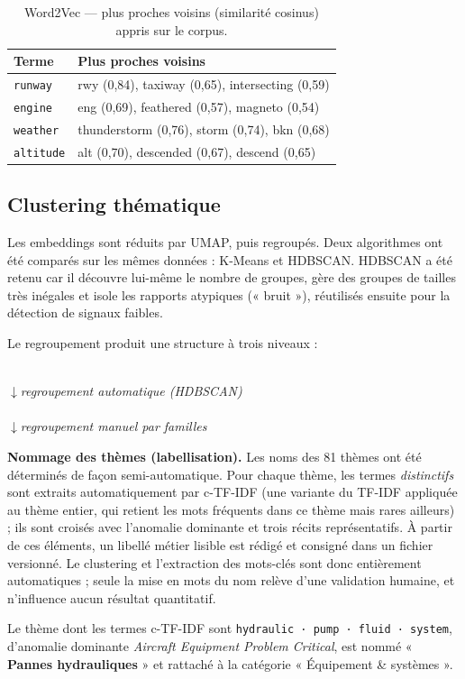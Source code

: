 \documentclass[11pt,a4paper]{article}
\newcommand{\exemple}[1]{\par\noindent #1}
\begin{document}
\begin{table}[h]\centering\small
\caption{Word2Vec — plus proches voisins (similarité cosinus) appris sur le corpus.}\label{tab:w2v}
\begin{tabular}{ll}
\toprule
\textbf{Terme} & \textbf{Plus proches voisins} \\
\midrule
\texttt{runway}   & rwy (0,84), taxiway (0,65), intersecting (0,59) \\
\texttt{engine}   & eng (0,69), feathered (0,57), magneto (0,54) \\
\texttt{weather}  & thunderstorm (0,76), storm (0,74), bkn (0,68) \\
\texttt{altitude} & alt (0,70), descended (0,67), descend (0,65) \\
\bottomrule
\end{tabular}
\end{table}

\subsection{Clustering thématique}
Les embeddings sont réduits par UMAP, puis regroupés. Deux algorithmes ont été comparés sur
les mêmes données : K-Means et HDBSCAN. HDBSCAN a été retenu car il découvre lui-même le
nombre de groupes, gère des groupes de tailles très inégales et isole les rapports atypiques
(« bruit »), réutilisés ensuite pour la détection de signaux faibles.

Le regroupement produit une structure à trois niveaux :
\begin{center}\small
{}\\[3pt]
$\downarrow$\;\textit{regroupement automatique (HDBSCAN)}\\[3pt]
\\[3pt]
$\downarrow$\;\textit{regroupement manuel par familles}\\[3pt]
\end{center}

\textbf{Nommage des thèmes (labellisation).} Les noms des 81 thèmes ont été déterminés de
façon semi-automatique. Pour chaque thème, les termes \emph{distinctifs} sont extraits
automatiquement par c-TF-IDF (une variante du TF-IDF appliquée au thème entier, qui retient
les mots fréquents dans ce thème mais rares ailleurs) ; ils sont croisés avec l'anomalie
dominante et trois récits représentatifs. À partir de ces éléments, un libellé métier lisible
est rédigé et consigné dans un fichier versionné. Le clustering et l'extraction des mots-clés
sont donc entièrement automatiques ; seule la mise en mots du nom relève d'une validation
humaine, et n'influence aucun résultat quantitatif.
\exemple{Le thème dont les termes c-TF-IDF sont \texttt{hydraulic · pump · fluid · system},
d'anomalie dominante \emph{Aircraft Equipment Problem Critical}, est nommé
« \textbf{Pannes hydrauliques} » et rattaché à la catégorie « Équipement \& systèmes ».}
\end{document}
